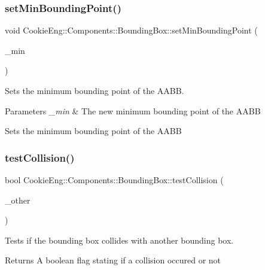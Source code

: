 \subsubsection{\texorpdfstring{set\+Min\+Bounding\+Point()}{setMinBoundingPoint()}}
{\footnotesize\ttfamily void Cookie\+Eng\+::\+Components\+::\+Bounding\+Box\+::set\+Min\+Bounding\+Point (\begin{DoxyParamCaption}\item[{const glm\+::vec3 \&}]{\+\_\+min }\end{DoxyParamCaption})\hspace{0.3cm}{\ttfamily [inline]}}



Sets the minimum bounding point of the A\+A\+BB. 


\begin{DoxyParams}{Parameters}
{\em \+\_\+min} & The new minimum bounding point of the A\+A\+BB\\
\hline
\end{DoxyParams}
Sets the minimum bounding point of the A\+A\+BB \mbox{\label{class_cookie_eng_1_1_components_1_1_bounding_box_aa121d65a4271d524fefb153f7388421a}} 
\subsubsection{\texorpdfstring{test\+Collision()}{testCollision()}\hspace{0.1cm}{\footnotesize\ttfamily [1/2]}}
{\footnotesize\ttfamily bool Cookie\+Eng\+::\+Components\+::\+Bounding\+Box\+::test\+Collision (\begin{DoxyParamCaption}\item[{const \hyperlink{class_cookie_eng_1_1_components_1_1_bounding_box}{Bounding\+Box} \&}]{\+\_\+other }\end{DoxyParamCaption})}



Tests if the bounding box collides with another bounding box. 

\begin{DoxyReturn}{Returns}
A boolean flag stating if a collision occured or not 
\end{DoxyReturn}

